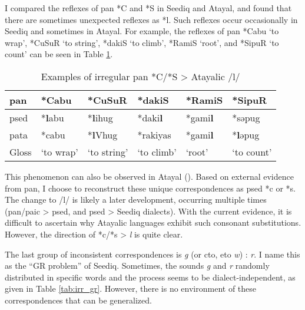 I compared the reflexes of \acl{pan} *C and *S in Seediq and Atayal, and found that there are sometimes unexpected reflexes as *l. Such reflexes occur occasionally in Seediq and sometimes in Atayal. For example, the reflexes of \acl{pan} *Cabu `to wrap', *CuSuR `to string', *dakiS `to climb', *RamiS `root', and *SipuR `to count' can be seen in Table \ref{tab:panclsaic}.

\begin{table}[!htbp]
\centering
\caption{Examples of irregular \acs{pan} *C/*S > Atayalic /l/}
\label{tab:panclsaic}
\begin{tabular}{llllll}
\hline
\acs{pan}  & *Cabu     & *CuSuR      & *dakiS     & *RamiS & *SipuR    \\ \hline
\acs{psed} & *\textbf{l}abu     & *\textbf{l}ihug      & *daki\textbf{l}     & *gami\textbf{l} & *səpug    \\
\acs{pata} & *cabu     & *\textbf{l}Vhug      & *rakiyas   & *gami\textbf{l} & *\textbf{l}əpug    \\ \hline
Gloss      & `to wrap' & `to string' & `to climb' & `root' & `to count' \\ \hline
\end{tabular}
\end{table}

This phenomenon can also be observed in Atayal (\cite[173]{goderich2020phd}). Based on external evidence from \acl{pan}, I choose to reconstruct these unique correspondences as \acl{psed} *c or *s. The change to /l/ is likely a later development, occurring multiple times (\acs{pan}/\acs{paic} > \acs{psed}, and \acs{psed} > Seediq dialects). With the current evidence, it is difficult to ascertain why Atayalic languages exhibit such consonant substitutions. However, the direction of *c/*s > \textit{l} is quite clear.

The last group of inconsistent correspondences is \textit{g} (or \ac{cto}, \ac{eto} \textit{w}) : \textit{r}. I name this as the ``GR problem'' of Seediq. Sometimes, the sounds \textit{g} and \textit{r} randomly distributed in specific words and the process seems to be dialect-independent, as given in Table \ref{tab:irr_gr}. However, there is no environment of these correspondences that can be generalized. 

